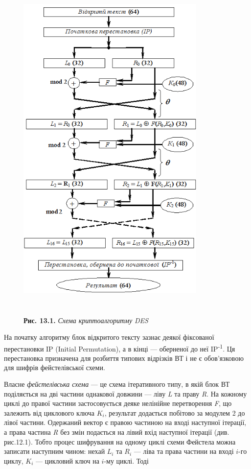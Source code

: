 \begin{figure}
\centering
\begin{minipage}{}
 \includegraphics[width=3.6764in,height=6.7484in]{crypt-img/crypt-img295.png} 
\begin{minipage}{3.25in}
\textbf{Рис. 13.1.} \textit{Схема криптоалгоритму }\textit{DES}
\end{minipage}\end{minipage}
\end{figure}
На початку алгоритму блок відкритого тексту зазнає деякої фіксованої
перестановки  IP (Initial Permutation), а в кінці --- оберненої до неї
IP\textsuperscript{{}-1}. Ця перестановка призначена для розбиття типових
відрізків ВТ і не є обов’язковою для шифрів фейстелівської схеми.

 Власне \textit{фейстелівська схема} --- це схема ітеративного типу, в якій блок
ВТ поділяється на дві частини однакової довжини --- ліву \textit{L} та праву
\textit{R}. На кожному циклі до правої частини застосовується деяке нелінійне
перетворення \textit{F}, що залежить від циклового ключа  $K_i$,
результат додається побітово за модулем 2 до лівої частини. Одержаний вектор є
правою частиною на вході наступної ітерації, а права частина \textit{R}  без
змін подається на лівий вхід наступної ітерації (див. рис.12.1). Тобто процес
шифрування на одному циклі схеми Фейстела можна записати наступним чином: нехай
 $L_i$ та   $R_i$ --- ліва та права частини на вході  $i${}-го
циклу,  $K_i$ --- цикловий ключ на   $i${}-му циклі. Тоді

